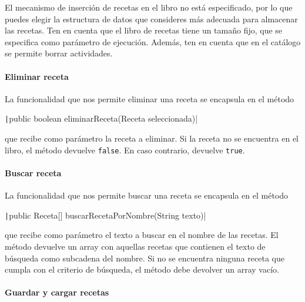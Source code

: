 \documentclass[
    a4paper, %
    12pt, %
]{CSSullivanBusinessReport}
\begin{document}

El mecanismo de inserción de recetas en el libro no está especificado, por lo que puedes elegir la estructura de datos que consideres más adecuada para almacenar las recetas. Ten en cuenta que el libro de recetas tiene un tamaño fijo, que se especifica como parámetro de ejecución. Además, ten en cuenta que en el catálogo se permite borrar actividades.

\paragraph{Eliminar receta}

La funcionalidad que nos permite eliminar una receta se encapsula en el método

\texttt|public boolean eliminarReceta(Receta seleccionada)|

que recibe como parámetro la receta a eliminar. Si la receta no se encuentra en el libro, el método devuelve \texttt{false}. En caso contrario, devuelve \texttt{true}.

\paragraph{Buscar receta}

La funcionalidad que nos permite buscar una receta se encapsula en el método

\texttt|public Receta[] buscarRecetaPorNombre(String texto)|

que recibe como parámetro el texto a buscar en el nombre de las recetas. El método devuelve un array con aquellas recetas que contienen el texto de búsqueda como subcadena del nombre. Si no se encuentra ninguna receta que cumpla con el criterio de búsqueda, el método debe devolver un array vacío.

\paragraph{Guardar y cargar recetas}
\end{document}
